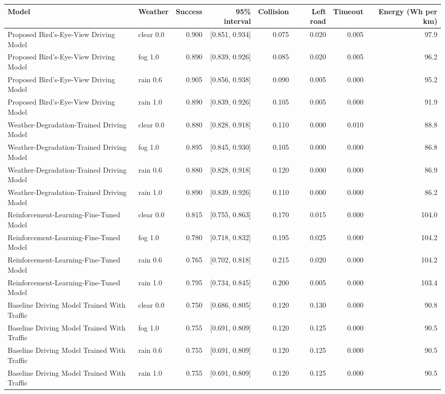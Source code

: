 \begin{tabular}{llrrrrrr}\toprule
Model & Weather & Success & 95\% interval & Collision & Left road & Timeout & Energy (Wh per km) \\\midrule
Proposed Bird's-Eye-View Driving Model & clear 0.0 & 0.900 & [0.851, 0.934] & 0.075 & 0.020 & 0.005 & 97.9 \\
Proposed Bird's-Eye-View Driving Model & fog 1.0 & 0.890 & [0.839, 0.926] & 0.085 & 0.020 & 0.005 & 96.2 \\
Proposed Bird's-Eye-View Driving Model & rain 0.6 & 0.905 & [0.856, 0.938] & 0.090 & 0.005 & 0.000 & 95.2 \\
Proposed Bird's-Eye-View Driving Model & rain 1.0 & 0.890 & [0.839, 0.926] & 0.105 & 0.005 & 0.000 & 91.9 \\
Weather-Degradation-Trained Driving Model & clear 0.0 & 0.880 & [0.828, 0.918] & 0.110 & 0.000 & 0.010 & 88.8 \\
Weather-Degradation-Trained Driving Model & fog 1.0 & 0.895 & [0.845, 0.930] & 0.105 & 0.000 & 0.000 & 86.8 \\
Weather-Degradation-Trained Driving Model & rain 0.6 & 0.880 & [0.828, 0.918] & 0.120 & 0.000 & 0.000 & 86.9 \\
Weather-Degradation-Trained Driving Model & rain 1.0 & 0.890 & [0.839, 0.926] & 0.110 & 0.000 & 0.000 & 86.2 \\
Reinforcement-Learning-Fine-Tuned Model & clear 0.0 & 0.815 & [0.755, 0.863] & 0.170 & 0.015 & 0.000 & 104.0 \\
Reinforcement-Learning-Fine-Tuned Model & fog 1.0 & 0.780 & [0.718, 0.832] & 0.195 & 0.025 & 0.000 & 104.2 \\
Reinforcement-Learning-Fine-Tuned Model & rain 0.6 & 0.765 & [0.702, 0.818] & 0.215 & 0.020 & 0.000 & 104.2 \\
Reinforcement-Learning-Fine-Tuned Model & rain 1.0 & 0.795 & [0.734, 0.845] & 0.200 & 0.005 & 0.000 & 103.4 \\
Baseline Driving Model Trained With Traffic & clear 0.0 & 0.750 & [0.686, 0.805] & 0.120 & 0.130 & 0.000 & 90.8 \\
Baseline Driving Model Trained With Traffic & fog 1.0 & 0.755 & [0.691, 0.809] & 0.120 & 0.125 & 0.000 & 90.5 \\
Baseline Driving Model Trained With Traffic & rain 0.6 & 0.755 & [0.691, 0.809] & 0.120 & 0.125 & 0.000 & 90.5 \\
Baseline Driving Model Trained With Traffic & rain 1.0 & 0.755 & [0.691, 0.809] & 0.120 & 0.125 & 0.000 & 90.5 \\
\bottomrule\end{tabular}
